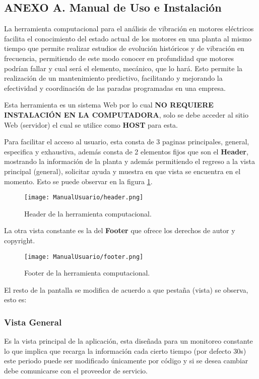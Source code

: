 \subsection{ANEXO A. Manual de Uso e Instalación}\label{anexoA}

La herramienta computacional para el análisis de vibración en motores eléctricos
facilita el conocimiento del estado actual de los motores en una planta al mismo
tiempo que permite realizar estudios de evolución históricos y de vibración en
frecuencia, permitiendo de este modo conocer en profundidad que motores podrían
fallar y cual será el elemento, mecánico, que lo hará. Esto permite la realización
de un mantenimiento predictivo, facilitando y mejorando la efectividad y
coordinación de las paradas programadas en una empresa.

Esta herramienta es un sistema Web por lo cual \textbf{NO REQUIERE INSTALACIÓN
EN LA COMPUTADORA}, solo se debe acceder al sitio Web (servidor) el cual se
utilice como \textbf{HOST} para esta.

Para facilitar el acceso al usuario, esta consta de 3 paginas principales,
general, especifica y exhaustiva, además consta de 2 elementos fijos que son el
\textbf{Header}, mostrando la información de la planta y además permitiendo
el regreso a la vista principal (general),  solicitar ayuda y muestra en que
vista se encuentra en el momento. Esto se puede observar en la figura
\ref{img:HeaderHerramienta}.

    \begin{figure}[H]
		\centering
        \caption{Header de la herramienta computacional. }
        \texttt{[image: ManualUsuario/header.png]}
        \label{img:HeaderHerramienta}
	\end{figure}

La otra vista constante es la del \textbf{Footer} que ofrece los derechos de autor
y copyright.

    \begin{figure}[H]
		\centering
        \caption{Footer de la herramienta computacional. }
        \texttt{[image: ManualUsuario/footer.png]}
        \label{img:FooterHerramienta}
	\end{figure}

El resto de la pantalla se modifica de acuerdo a que pestaña (vista) se observa,
esto es:

\subsubsection{Vista General}
Es la vista principal de la aplicación, esta diseñada para un monitoreo constante
lo que implica que recarga la información cada cierto tiempo (por defecto 30s)
este periodo puede ser modificado únicamente por código y si se desea cambiar debe
comunicarse con el proveedor de servicio.


